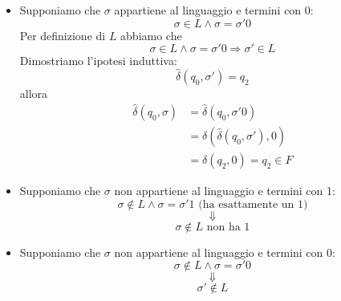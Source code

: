 \documentclass[a4paper]{article}
\begin{document}
{\begin{itemize}
\begin{itemize}
        \item Supponiamo che \( \sigma  \) appartiene al linguaggio e termini con 0:
          \[
            \sigma \in L \wedge \sigma = \sigma'0
          \] 
          Per definizione di \( L \) abbiamo che
          \[
            \sigma \in L \wedge \sigma = \sigma'0 \Rightarrow \sigma' \in L
          \] 
          Dimostriamo l'ipotesi induttiva:
          \[
            \hat{\delta}(q_0, \sigma') = q_2
          \] 
          allora
          \[
            \begin{aligned}
              \hat{\delta}(q_0, \sigma) &= \hat{\delta}(q_0, \sigma'0)\\
                                        &= \delta(\hat{\delta}(q_0, \sigma'), 0)\\
                                        &= \delta(q_2, 0) = q_2 \in F
            \end{aligned}
          \] 

        \item Supponiamo che \( \sigma  \) non appartiene al linguaggio e termini con 1:
          \[
            \sigma \notin L \wedge  \sigma  = \sigma'1 \text{ (ha esattamente un 1)}
          \] 
          \[
            \Downarrow
          \] 
          \[
            \sigma  \notin L \text{ non ha 1}
          \] 

        \item Supponiamo che \( \sigma  \) non appartiene al linguaggio e termini con 0:
          \[
            \sigma \notin L \wedge  \sigma  = \sigma'0
          \] 
          \[
            \Downarrow
          \] 
          \[
            \sigma' \notin L
          \] 
      \end{itemize}
  \end{itemize}     
}
\end{document}
